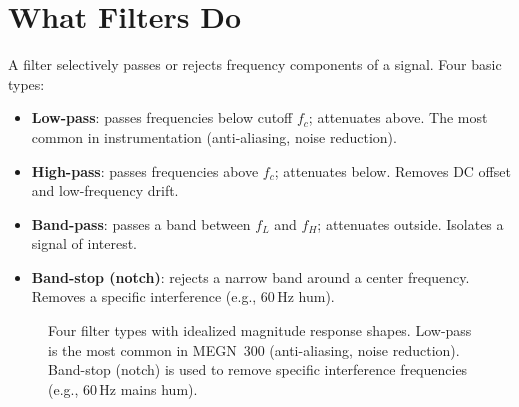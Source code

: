 \documentclass[11pt,letterpaper,twoside,openany]{book}
\begin{document}
\section{What Filters Do}
A filter selectively passes or rejects frequency components of a signal. Four basic types:
\begin{itemize}[nosep,leftmargin=1.5em]
\item \textbf{Low-pass}: passes frequencies below cutoff $f_c$; attenuates above. The most common in instrumentation (anti-aliasing, noise reduction).
\item \textbf{High-pass}: passes frequencies above $f_c$; attenuates below. Removes DC offset and low-frequency drift.
\item \textbf{Band-pass}: passes a band between $f_L$ and $f_H$; attenuates outside. Isolates a signal of interest.
\item \textbf{Band-stop (notch)}: rejects a narrow band around a center frequency. Removes a specific interference (e.g., 60\,Hz hum).
\end{itemize}

\begin{figure}[htbp]
\centering
{}
\caption{Four filter types with idealized magnitude response shapes. Low-pass is the most common in MEGN~300 (anti-aliasing, noise reduction). Band-stop (notch) is used to remove specific interference frequencies (e.g., 60\,Hz mains hum).}
\label{fig:filters}
\end{figure}
\end{document}
